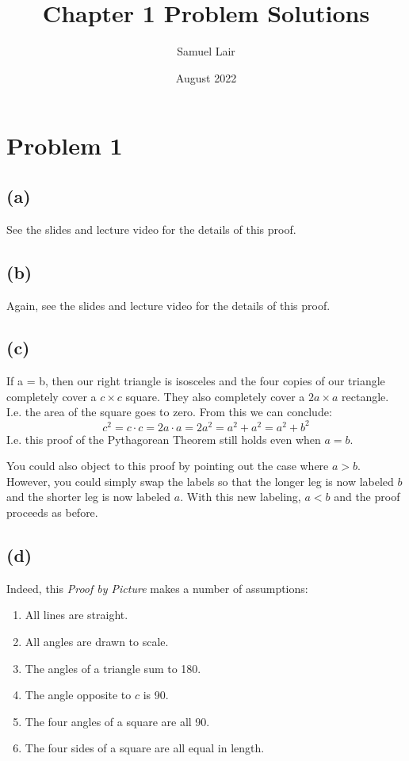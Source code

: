 \documentclass{article}
\title{Chapter 1 Problem Solutions}
\author{Samuel Lair}
\date{August 2022}
\begin{document}
\maketitle
\tableofcontents

\pagebreak

\section{Problem 1}
\subsection{(a)}
See the slides and lecture video for the details of this proof.
\subsection{(b)}
Again, see the slides and lecture video for the details of this proof.
\subsection{(c)}
If a = b, then our right triangle is isosceles and the four copies of our triangle completely cover a $c \times c$ square.  They also completely cover a $2a \times a$ rectangle.  I.e. the area of the square goes to zero. From this we can conclude:
\[c^2 = c \cdot c = 2a \cdot a = 2a^2 = a^2 + a^2 = a^2 + b^2\]
I.e. this proof of the Pythagorean Theorem still holds even when $a = b$.

You could also object to this proof by pointing out the case where $a > b$. However, you could simply swap the labels so that the longer leg is now labeled $b$ and the shorter leg is now labeled $a$. With this new labeling, $a < b$ and the proof proceeds as before.
\subsection{(d)}
Indeed, this \textit{Proof by Picture} makes a number of assumptions:
\begin{enumerate}
	\item All lines are straight.
	\item All angles are drawn to scale.
	\item The angles of a triangle sum to 180\degree.
	\item The angle opposite to $c$ is 90\degree.
	\item The four angles of a square are all 90\degree.
	\item The four sides of a square are all equal in length.
\end{enumerate}
\end{document}
